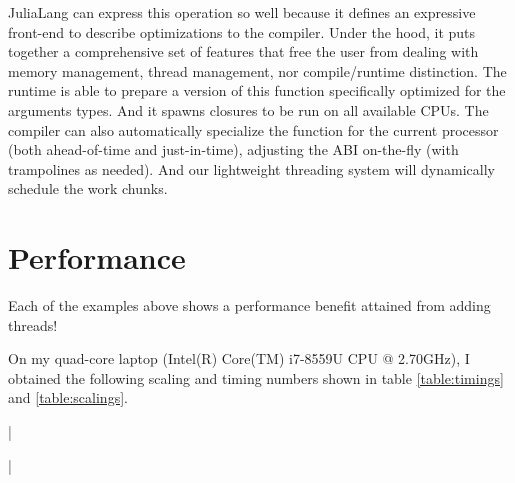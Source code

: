 \documentclass{juliacon}
\begin{document}
JuliaLang can express this operation so well because it defines an expressive front-end to describe optimizations to the compiler. Under the hood, it puts together a comprehensive set of features that free the user from dealing with memory management, thread management, nor compile/runtime distinction. The runtime is able to prepare a version of this function specifically optimized for the arguments types. And it spawns closures to be run on all available CPUs. The compiler can also automatically specialize the function for the current processor (both ahead-of-time and just-in-time), adjusting the ABI on-the-fly (with trampolines as needed). And our lightweight threading system will dynamically schedule the work chunks.

\section{Performance}
\label{subsub:performance}

Each of the examples above shows a performance benefit attained from adding threads!

On my quad-core laptop (Intel(R) Core(TM) i7-8559U CPU @ 2.70GHz), I obtained the following scaling and timing numbers shown in table \ref{table:timings} and \ref{table:scalings}.

\lstDeleteShortInline|
\begin{table}[ht]
\label{table:timings}
\end{table}

\begin{table}[ht]
\label{table:scalings}
\end{table}
\lstMakeShortInline[language=Julia,columns=fixed]|
\end{document}
